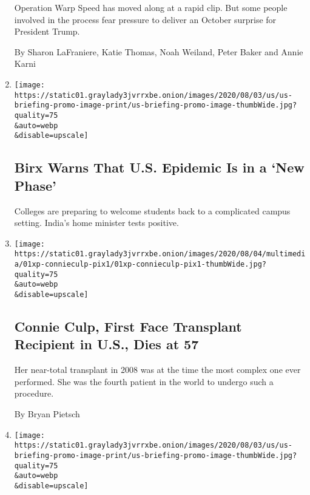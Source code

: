 \begin{enumerate}
  Operation Warp Speed has moved along at a rapid clip. But some people
  involved in the process fear pressure to deliver an October surprise
  for President Trump.

  By Sharon LaFraniere, Katie Thomas, Noah Weiland, Peter Baker and
  Annie Karni
\item
  \href{/2020/08/02/world/coronavirus-covid-19.html}{}

  \texttt{[image: https://static01.graylady3jvrrxbe.onion/images/2020/08/03/us/us-briefing-promo-image-print/us-briefing-promo-image-thumbWide.jpg?quality=75\\\&auto=webp\\\&disable=upscale]}

  \hypertarget{birx-warns-that-us-epidemic-is-in-a-new-phase}{%
  \subsection{Birx Warns That U.S. Epidemic Is in a `New
  Phase'}\label{birx-warns-that-us-epidemic-is-in-a-new-phase}}

  Colleges are preparing to welcome students back to a complicated
  campus setting. India's home minister tests positive.
\item
  \href{/2020/08/01/us/Connie-culp-dead-face-transplant.html}{}

  \texttt{[image: https://static01.graylady3jvrrxbe.onion/images/2020/08/04/multimedia/01xp-connieculp-pix1/01xp-connieculp-pix1-thumbWide.jpg?quality=75\\\&auto=webp\\\&disable=upscale]}

  \hypertarget{connie-culp-first-face-transplant-recipient-in-us-dies-at-57}{%
  \subsection{Connie Culp, First Face Transplant Recipient in U.S., Dies
  at
  57}\label{connie-culp-first-face-transplant-recipient-in-us-dies-at-57}}

  Her near-total transplant in 2008 was at the time the most complex one
  ever performed. She was the fourth patient in the world to undergo
  such a procedure.

  By Bryan Pietsch
\item
  \href{/2020/08/01/world/coronavirus-covid-19.html}{}

  \texttt{[image: https://static01.graylady3jvrrxbe.onion/images/2020/08/03/us/us-briefing-promo-image-print/us-briefing-promo-image-thumbWide.jpg?quality=75\\\&auto=webp\\\&disable=upscale]}

  \hypertarget{infections-swamp-the-us-which-recorded-42-of-all-its-coronavirus-cases-in-july}{%
}
\end{enumerate}
